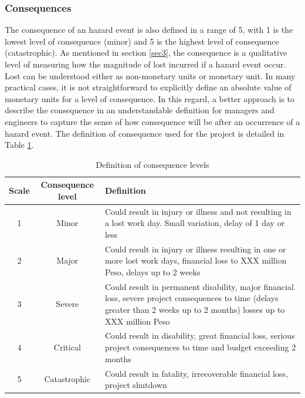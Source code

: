 \documentclass[10pt,halfline,a4paper]{ouparticle}
\begin{document}
\subsubsection{Consequences} \label{cons}
The consequence of an hazard event is also defined in a range of 5, with 1 is the lowest level of consequence (minor) and 5 is the highest level of consequence (catastrophic). As mentioned in section \ref{sec3}, the consequence is a qualitative level of measuring how the magnitude of lost incurred if a hazard event occur. Lost can be understood either as non-monetary units or monetary unit. In many practical cases, it is not straightforward to explicitly define an absolute value of monetary units for a level of consequence. In this regard, a better approach is to describe the consequence in an understandable definition for managers and engineers to capture the sense of how consequence will be after an occurrence of a hazard event. The definition of consequence used for the project is detailed in Table \ref{tbl_consequences}.

\begin{table}
\centering
\caption{Definition of consequence levels}
\begin{tabular}{l|p{2cm}|p{10cm}}
\hline
\multicolumn{1}{c|}{Scale} & \multicolumn{1}{c|}{Consequence level} & Definition \\ 
\hline
\multicolumn{1}{c|}{1} & \multicolumn{1}{c|}{Minor} & Could result in injury or illness and not resulting in a lost work day. Small variation, delay of 1 day or less \\ 
\multicolumn{1}{c|}{2} & \multicolumn{1}{c|}{Major} & Could result in injury or illness resulting in one or more lost work days, financial loss to XXX million Peso, delays up to 2 weeks \\ 
\multicolumn{1}{c|}{3} & \multicolumn{1}{c|}{Severe} & Could result in permanent disability, major financial loss, severe project consequences to time (delays greater than 2 weeks up to 2 months) losses up to XXX million Peso \\ 
\multicolumn{1}{c|}{4} & \multicolumn{1}{c|}{Critical} & Could result in disability, great financial loss, serious project consequences to time and budget exceeding 2 months \\ 
\multicolumn{1}{c|}{5} & \multicolumn{1}{c|}{Catastrophic} & Could result in fatality, irrecoverable financial loss, project shutdown \\ 
\hline
\end{tabular}
\label{tbl_consequences}
\end{table}
\end{document}
